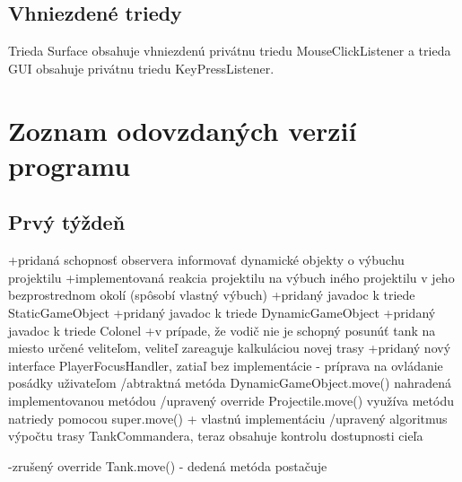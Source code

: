 \documentclass[12pt,oneside,slovak,a4paper]{article}
\begin{document}
\subsection{Vhniezdené triedy}
Trieda Surface obsahuje vhniezdenú privátnu triedu MouseClickListener a trieda GUI obsahuje privátnu triedu KeyPressListener.
\section{Zoznam odovzdaných verzií programu}
\subsection{Prvý týždeň}
+pridaná schopnosť observera informovať dynamické objekty o výbuchu projektilu \newline
+implementovaná reakcia projektilu na výbuch iného projektilu v jeho bezprostrednom okolí (spôsobí vlastný výbuch)\newline
+pridaný javadoc k triede StaticGameObject\newline
+pridaný javadoc k triede DynamicGameObject\newline
+pridaný javadoc k triede Colonel\newline
+v prípade, že vodič nie je schopný posunúť tank na miesto určené veliteľom, veliteľ zareaguje kalkuláciou novej trasy\newline
+pridaný nový interface PlayerFocusHandler, zatiaľ bez implementácie - príprava na ovládanie posádky uživateľom\newline
\newline
/abtraktná metóda DynamicGameObject.move() nahradená implementovanou metódou\newline
/upravený override Projectile.move() využíva metódu natriedy pomocou super.move() + vlastnú implementáciu\newline
/upravený algoritmus výpočtu trasy TankCommandera, teraz obsahuje kontrolu dostupnosti cieľa\newline

-zrušený override Tank.move() - dedená metóda postačuje\newline
\end{document}
